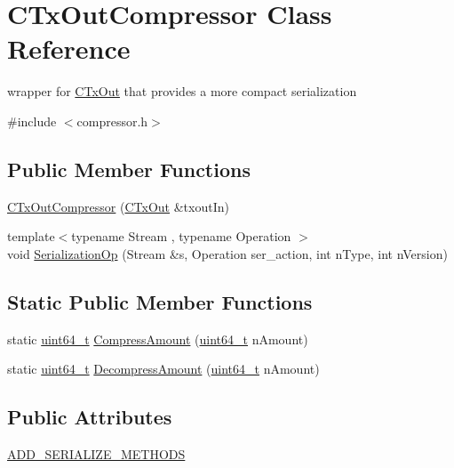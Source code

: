 \hypertarget{class_c_tx_out_compressor}{}\section{C\+Tx\+Out\+Compressor Class Reference}
\label{class_c_tx_out_compressor}


wrapper for \hyperlink{class_c_tx_out}{C\+Tx\+Out} that provides a more compact serialization  




{\ttfamily \#include $<$compressor.\+h$>$}

\subsection*{Public Member Functions}
\begin{DoxyCompactItemize}
\item 
\hyperlink{class_c_tx_out_compressor_a38ef1033989cd003de65598620d15cea}{C\+Tx\+Out\+Compressor} (\hyperlink{class_c_tx_out}{C\+Tx\+Out} \&txout\+In)
\item 
{\footnotesize template$<$typename Stream , typename Operation $>$ }\\void \hyperlink{class_c_tx_out_compressor_aad933ec09f7d6a764bd49da399f9083b}{Serialization\+Op} (Stream \&s, Operation ser\+\_\+action, int n\+Type, int n\+Version)
\end{DoxyCompactItemize}
\subsection*{Static Public Member Functions}
\begin{DoxyCompactItemize}
\item 
static \hyperlink{stdint_8h_aaa5d1cd013383c889537491c3cfd9aad}{uint64\+\_\+t} \hyperlink{class_c_tx_out_compressor_a4141cec8885a2da956abb79130c963a8}{Compress\+Amount} (\hyperlink{stdint_8h_aaa5d1cd013383c889537491c3cfd9aad}{uint64\+\_\+t} n\+Amount)
\item 
static \hyperlink{stdint_8h_aaa5d1cd013383c889537491c3cfd9aad}{uint64\+\_\+t} \hyperlink{class_c_tx_out_compressor_a97751249d6a23b2a2b7bbc1165973371}{Decompress\+Amount} (\hyperlink{stdint_8h_aaa5d1cd013383c889537491c3cfd9aad}{uint64\+\_\+t} n\+Amount)
\end{DoxyCompactItemize}
\subsection*{Public Attributes}
\begin{DoxyCompactItemize}
\item 
\hyperlink{class_c_tx_out_compressor_a520b323886560ededcfe303c4672481e}{A\+D\+D\+\_\+\+S\+E\+R\+I\+A\+L\+I\+Z\+E\+\_\+\+M\+E\+T\+H\+O\+D\+S}
\end{DoxyCompactItemize}



